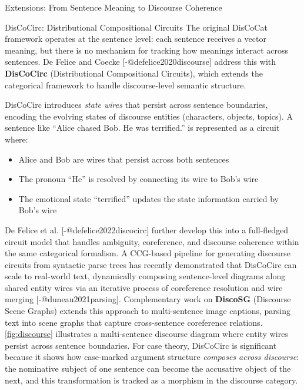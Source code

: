 \documentclass[
  ignorenonframetext,
]{beamer}
\providecommand{\tightlist}{%
  \setlength{\itemsep}{0pt}\setlength{\parskip}{0pt}}
\begin{document}
\begin{frame}{Extensions: From Sentence Meaning to Discourse Coherence}
\protect{}\label{extensions-from-sentence-meaning-to-discourse-coherence}
\begin{block}{DisCoCirc: Distributional Compositional Circuits}
\protect{}\label{discocirc-distributional-compositional-circuits}
The original DisCoCat framework operates at the sentence level: each
sentence receives a vector meaning, but there is no mechanism for
tracking how meanings interact across sentences. De Felice and Coecke
{[}-@defelice2020discourse{]} address this with \textbf{DisCoCirc}
(Distributional Compositional Circuits), which extends the categorical
framework to handle discourse-level semantic structure.

DisCoCirc introduces \emph{state wires} that persist across sentence
boundaries, encoding the evolving states of discourse entities
(characters, objects, topics). A sentence like ``Alice chased Bob. He
was terrified.'' is represented as a circuit where:

\begin{itemize}
\tightlist
\item
  Alice and Bob are wires that persist across both sentences
\item
  The pronoun ``He'' is resolved by connecting its wire to Bob's wire
\item
  The emotional state ``terrified'' updates the state information
  carried by Bob's wire
\end{itemize}

De Felice et al. {[}-@defelice2022discocirc{]} further develop this into
a full-fledged circuit model that handles ambiguity, coreference, and
discourse coherence within the same categorical formalism. A CCG-based
pipeline for generating discourse circuits from syntactic parse trees
has recently demonstrated that DisCoCirc can scale to real-world text,
dynamically composing sentence-level diagrams along shared entity wires
via an iterative process of coreference resolution and wire merging
{[}-@duneau2021parsing{]}. Complementary work on \textbf{DiscoSG}
(Discourse Scene Graphs) extends this approach to multi-sentence image
captions, parsing text into scene graphs that capture cross-sentence
coreference relations. \autoref{fig:discourse} illustrates a
multi-sentence discourse diagram where entity wires persist across
sentence boundaries. For case theory, DisCoCirc is significant because
it shows how case-marked argument structure \emph{composes across
discourse}: the nominative subject of one sentence can become the
accusative object of the next, and this transformation is tracked as a
morphism in the discourse category.


\end{block}
\end{frame}
\end{document}
